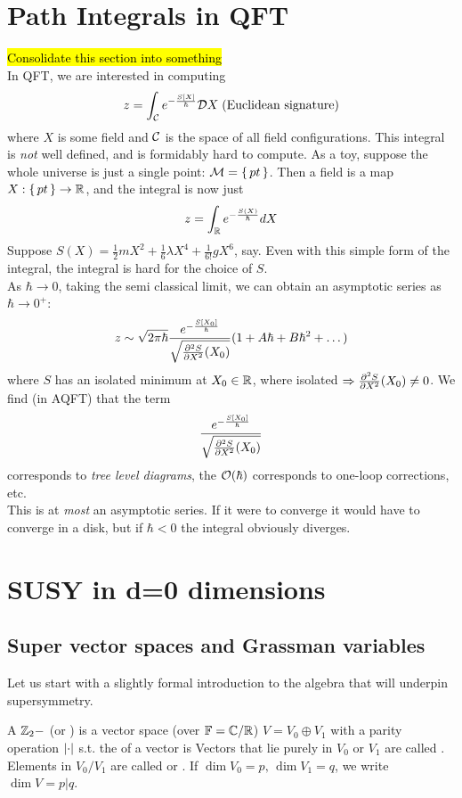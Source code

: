 \documentclass{article}
\begin{document}
\section{Path Integrals in QFT}
\hl{Consolidate this section into something} \\
In QFT, we are interested in computing 
\[
z = \int_\mc{C} e^{-\frac{S[X]}{\hbar}} \mc{D}X \; \text{(Euclidean signature)}
\]
where $X$ is some field and $\mc{C}$ is the space of all field configurations. This integral is \emph{not} well defined, and is formidably hard to compute. 
As a toy, suppose the whole universe is just a single point: $\mc{M} = \set{pt}$. Then a field is a map $X:\set{pt} \to \mbb{R}$, and the integral is now just 
\[
z = \int_\mbb{R} e^{-\frac{S(X)}{\hbar}} dX
\]
Suppose $S(X) = \frac{1}{2}mX^2 + \frac{1}{6}\lambda X^4 +\frac{1}{6!} gX^6$, say. Even with this simple form of the integral, the integral is hard for the choice of $S$. \\
As $\hbar \to 0$, taking the semi classical limit, we can obtain an asymptotic series as $\hbar \to 0^+$: 
\[
z \sim \sqrt{2\pi\hbar}\frac{e^{-\frac{S[X_0]}{\hbar}}}{\sqrt{\pds[S]{X}(X_0)}}(1+A\hbar + B\hbar^2+\dots)
\]
where $S$ has an isolated minimum at $X_0\in\mbb{R}$, where isolated $\Rightarrow \pds[S]{X}(X_0) \neq0$. We find (in AQFT) that the term \[
\frac{e^{-\frac{S[X_0]}{\hbar}}}{\sqrt{\pds[S]{X}(X_0)}}
\]
corresponds to \emph{tree level diagrams}, the $\mc{O}(\hbar)$ corresponds to one-loop corrections, etc. \\
This is at \emph{most} an asymptotic series. If it were to converge it would have to converge in a disk, but if $\hbar < 0$ the integral obviously diverges. 

\section{SUSY in d=0 dimensions}
\subsection{Super vector spaces and Grassman variables}
Let us start with a slightly formal introduction to the algebra that will underpin supersymmetry. 

\begin{definition}
	A $\mbb{Z}_2-$ (or ) is a vector space (over $\mbb{F}= \mbb{C}/\mbb{R}$) $V = V_0 \oplus V_1$ with a parity operation $\abs{\cdot}$  s.t. the  of a vector is 
Vectors that lie purely in $V_0$ or $V_1$ are called . Elements in $V_0 / V_1$ are called  or . If $\dim V_{0}=p, \, \dim V_1 = q$, we write $\dim V = p | q$.
\end{definition}
\end{document}
